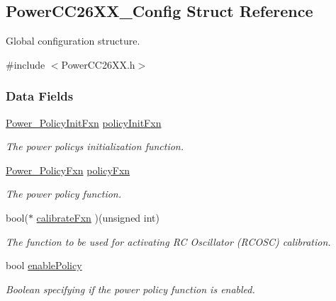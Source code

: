 \subsection{Power\+C\+C26\+X\+X\+\_\+\+Config Struct Reference}
\label{struct_power_c_c26_x_x___config}


Global configuration structure.  




{\ttfamily \#include $<$Power\+C\+C26\+X\+X.\+h$>$}

\subsubsection*{Data Fields}
\begin{DoxyCompactItemize}
\item 
\hyperlink{_power_8h_a435fdeb71d13ea6be86f599c9b6a0d78}{Power\+\_\+\+Policy\+Init\+Fxn} \hyperlink{struct_power_c_c26_x_x___config_aa5fa2edd433b84788c63277a21bc8dea}{policy\+Init\+Fxn}
\begin{DoxyCompactList}\small\item\em The power policy\textquotesingle{}s initialization function. \end{DoxyCompactList}\item 
\hyperlink{_power_8h_a333038d1e9cd5f93dda7b83f8a1afa8b}{Power\+\_\+\+Policy\+Fxn} \hyperlink{struct_power_c_c26_x_x___config_acd4011995544865f832440e9d869b563}{policy\+Fxn}
\begin{DoxyCompactList}\small\item\em The power policy function. \end{DoxyCompactList}\item 
bool($\ast$ \hyperlink{struct_power_c_c26_x_x___config_a92f68736067cceef7bbc32408b5bec96}{calibrate\+Fxn} )(unsigned int)
\begin{DoxyCompactList}\small\item\em The function to be used for activating R\+C Oscillator (R\+C\+O\+S\+C) calibration. \end{DoxyCompactList}\item 
bool \hyperlink{struct_power_c_c26_x_x___config_a0dabcd65e4700189af683ce0f54e8479}{enable\+Policy}
\begin{DoxyCompactList}\small\item\em Boolean specifying if the power policy function is enabled. \end{DoxyCompactList}\item 

\end{DoxyCompactItemize}
